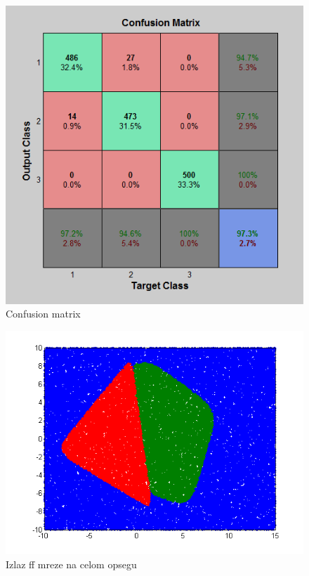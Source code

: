 \documentclass{report}
\begin{document}
\begin{enumerate}
\begin{enumerate}
\begin{figure}[!h]
\begin{center}
\includegraphics[scale=0.7]{B1confussionFF1.png}
\caption{Confusion matrix}
\end{center}
\end{figure}

\begin{figure}[!h]
\begin{center}
\includegraphics[scale=0.8]{B1outputFF1Random50000.png}
\caption{Izlaz ff mreze na celom opsegu}
\end{center}
\end{figure}










\end{enumerate}
\end{enumerate}
\end{document}

